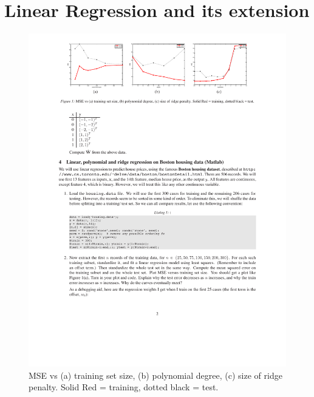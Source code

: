 \documentclass[11pt]{article}
\begin{document}
\section*{Linear Regression and its extension}
\begin{figure}
	\centering
	\includegraphics[width=1\linewidth]{fig}
	\caption{MSE vs (a) training set size, (b) polynomial degree, (c) size of ridge penalty. Solid Red = training, dotted black = test.}
	\label{fig:fig}
\end{figure}
\end{document}
